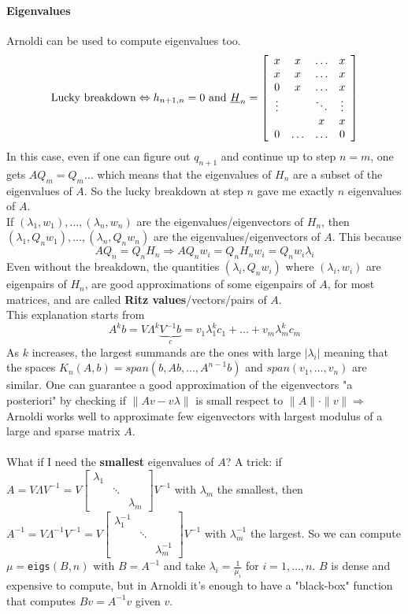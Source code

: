 \documentclass[10pt]{report}
\begin{document}
\paragraph{Eigenvalues} Arnoldi can be used to compute eigenvalues too. $$\text{Lucky breakdown}\Leftrightarrow h_{n+1,n}=0 \text{ and } \underline{H}_n=\left[\begin{array}{c c c c}
x & x & \ldots & x\\
x & x & \ldots & x\\
0 & x & \ldots & x\\
\vdots & & \ddots & \vdots\\
& & x & x\\
0 & \ldots & \ldots & 0
\end{array}\right]$$
In this case, even if one can figure out $q_{n+1}$ and continue up to step $n=m$, one gets $AQ_m = Q_m\ldots$ which means that the eigenvalues of $H_n$ are a subset of the eigenvalues of $A$. So the lucky breakdown at step $n$ gave me exactly $n$ eigenvalues of $A$.\\
If $(\lambda_1,w_1),\ldots,(\lambda_n,w_n)$ are the eigenvalues/eigenvectors of $H_n$, then $(\lambda_1,Q_nw_1),\ldots,(\lambda_n,Q_nw_n)$ are the eigenvalues/eigenvectors of $A$. This because $$AQ_n = Q_nH_n \Rightarrow AQ_nw_i = Q_nH_nw_i = Q_nw_i\lambda_i$$
Even without the breakdown, the quantities $(\lambda_i, Q_nw_i)$ where $(\lambda_i, w_i)$ are eigenpairs of $H_n$, are good approximations of some eigenpairs of $A$, for most matrices, and are called \textbf{Ritz values}/vectors/pairs of $A$.\\
This explanation starts from $$A^kb = V \Lambda^k \underset{c}{\underbrace{V^{-1} b}} = v_1\lambda_1^kc_1+\ldots+v_m\lambda_m^kc_m$$
As $k$ increases, the largest summands are the ones with large $|\lambda_i|$ meaning that the spaces $K_n(A,b)=span(b,Ab,\ldots,A^{n-1}b)$ and $span(v_1,\ldots,v_n)$ are similar. One can guarantee a good approximation of the eigenvectors "a posteriori" by checking if $\|Av-v\lambda\|$ is small respect to $\|A\|\cdot\|v\|\Rightarrow$ Arnoldi works well to approximate few eigenvectors with largest modulus of a large and sparse matrix $A$.\\\\
What if I need the \textbf{smallest} eigenvalues of $A$? A trick: if $A=V\Lambda V^{-1} = V\left[\begin{array}{ccc}
\lambda_1\\
&\ddots\\
& &\lambda_m
\end{array}\right]V^{-1}$ with $\lambda_m$ the smallest, then $A^{-1}=V\Lambda^{-1} V^{-1} = V\left[\begin{array}{ccc}
\lambda_1^{-1}\\
&\ddots\\
& &\lambda_m^{-1}
\end{array}\right]V^{-1}$ with $\lambda_m^{-1}$ the largest. So we can compute $\mu=$\texttt{eigs}$(B,n)$ with $B=A^{-1}$ and take $\lambda_i = \frac{1}{\mu_i}$ for $i=1,\ldots,n$. $B$ is dense and expensive to compute, but in Arnoldi it's enough to have a "black-box" function that computes $Bv=A^{-1}v$ given $v$.\\
\end{document}
